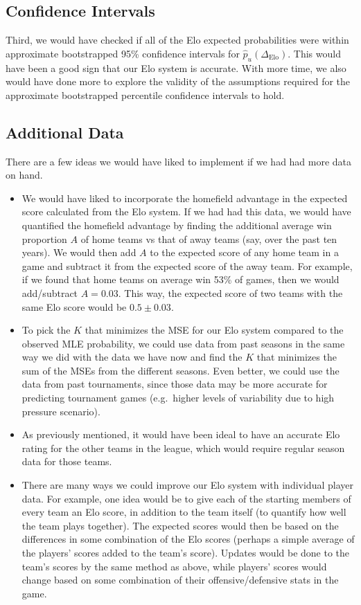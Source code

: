 \documentclass{article}
\begin{document}
\subsection{Confidence Intervals}
Third, we would have checked if all of the Elo expected probabilities were within approximate bootstrapped 95\% confidence intervals for $\hat{p}_u(\Delta_{\text{Elo}})$. This would have been a good sign that our Elo system is accurate. With more time, we also would have done more to explore the validity of the assumptions required for the approximate bootstrapped percentile confidence intervals to hold.

\subsection{Additional Data}\label{additionalData}
There are a few ideas we would have liked to implement if we had had more data on hand.
\begin{itemize}
    \item We would have liked to incorporate the homefield advantage in the expected score calculated from the Elo system. If we had had this data, we would have quantified the homefield advantage by finding the additional average win proportion $A$ of home teams vs that of away teams (say, over the past ten years). We would then add $A$ to the expected score of any home team in a game and subtract it from the expected score of the away team. For example, if we found that home teams on average win 53\% of games, then we would add/subtract $A=0.03$. This way, the expected score of two teams with the same Elo score would be $0.5 \pm 0.03$. 
    \item To pick the $K$ that minimizes the MSE for our Elo system compared to the observed MLE probability, we could use data from past seasons in the same way we did with the data we have now and find the $K$ that minimizes the sum of the MSEs from the different seasons. Even better, we could use the data from past tournaments, since those data may be more accurate for predicting tournament games (e.g.\ higher levels of variability due to high pressure scenario).
    \item As previously mentioned, it would have been ideal to have an accurate Elo rating for the other teams in the league, which would require regular season data for those teams.
    \item There are many ways we could improve our Elo system with individual player data. For example, one idea would be to give each of the starting members of every team an Elo score, in addition to the team itself (to quantify how well the team plays together). The expected scores would then be based on the differences in some combination of the Elo scores (perhaps a simple average of the players' scores added to the team's score). Updates would be done to the team's scores by the same method as above, while players' scores would change based on some combination of their offensive/defensive stats in the game.
\end{itemize}




\newpage


\end{document}
